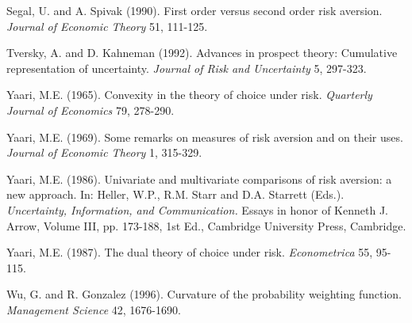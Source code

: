 \documentclass[11pt]{article}
\begin{document}
\begin{spacing}{0.0}
\begin{thebibliography}{99}
{\sc Segal, U. and A. Spivak} (1990).
First order versus second order risk aversion.
{\it Journal of Economic Theory} 51, 111-125.

{\sc Tversky, A. and D. Kahneman} (1992).
Advances in prospect theory: Cumulative representation of uncertainty.
{\it Journal of Risk and Uncertainty} 5, 297-323.

{\sc Yaari, M.E.} (1965).
Convexity in the theory of choice under risk.
{\it Quarterly Journal of Economics} 79, 278-290.

{\sc Yaari, M.E.} (1969).
Some remarks on measures of risk aversion and on their uses.
{\it Journal of Economic Theory} 1, 315-329.

{\sc Yaari, M.E.} (1986).
Univariate and multivariate comparisons of risk aversion: a new approach.
In: Heller, W.P., R.M. Starr and D.A. Starrett (Eds.).
{\it Uncertainty, Information, and Communication.}
Essays in honor of Kenneth J. Arrow, Volume III,
pp. 173-188, 1st Ed.,
Cambridge University Press, Cambridge.

{\sc Yaari, M.E.} (1987).
The dual theory of choice under risk.
{\it Econometrica} 55, 95-115.

{\sc Wu, G. and R. Gonzalez} (1996).
Curvature of the probability weighting function.
{\it Management Science} 42, 1676-1690.

\end{thebibliography}

\end{spacing}
\end{document}
